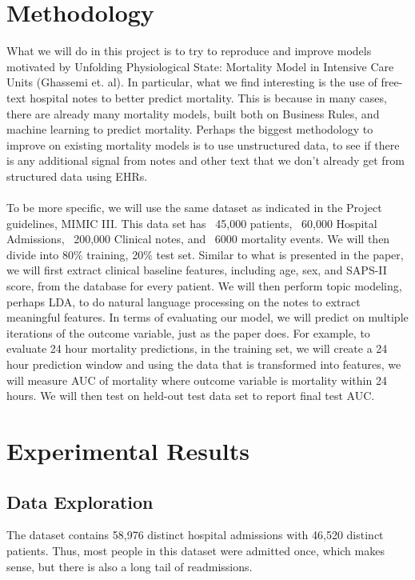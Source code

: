 \documentclass[12pt, final]{article}
\begin{document}
\section{Methodology}
\label{Methodology}

What we will do in this project is to try to reproduce and improve models motivated by Unfolding Physiological State: Mortality Model in Intensive Care Units (Ghassemi et. al). In particular, what we find interesting is the use of free-text hospital notes to better predict mortality. This is because in many cases, there are already many mortality models, built both on Business Rules, and machine learning to predict mortality. Perhaps the biggest methodology to improve on existing mortality models is to use unstructured data, to see if there is any additional signal from notes and other text that we don't already get from structured data using EHRs.
\\
\\
To be more specific, we will use the same dataset as indicated in the Project guidelines, MIMIC III. This data set has ~45,000 patients, ~60,000 Hospital Admissions, ~200,000 Clinical notes, and ~6000 mortality events. We will then divide into 80\% training, 20\% test set. Similar to what is presented in the paper, we will first extract clinical baseline features, including age, sex, and SAPS-II score, from the database for every patient. We will then perform topic modeling, perhaps LDA, to do natural language processing on the notes to extract meaningful features. In terms of evaluating our model, we will predict on multiple iterations of the outcome variable, just as the paper does. For example, to evaluate 24 hour mortality predictions, in the training set, we will create a 24 hour prediction window and using the data that is transformed into features, we will measure AUC of mortality where outcome variable is mortality within 24 hours. We will then test on held-out test data set to report final test AUC.

\section{Experimental Results}
\label{Experimental Results}

\subsection{Data Exploration}
The dataset contains 58,976 distinct hospital admissions with 46,520 distinct patients. Thus, most people in this dataset were admitted once, which makes sense, but there is also a long tail of readmissions.
\end{document}
